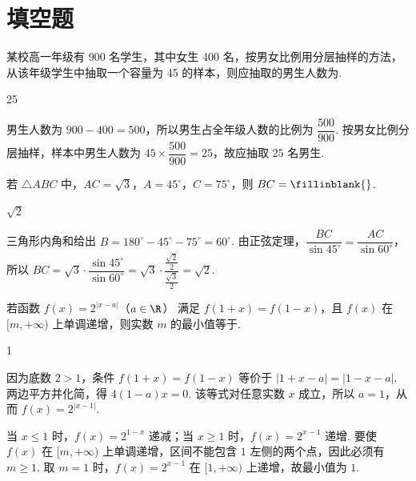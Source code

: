\section{填空题}

\begin{problem}
某校高一年级有 900 名学生，其中女生 400 名，按男女比例用分层抽样的方法，从该年级学生中抽取一个容量为 45 的样本，则应抽取的男生人数为\fillinblank{}.
\end{problem}

\begin{answer}
25
\end{answer}

\begin{solution}
男生人数为 \(900-400=500\)，所以男生占全年级人数的比例为 \(\dfrac{500}{900}\). 按男女比例分层抽样，样本中男生人数为 \(45\times\dfrac{500}{900}=25\)，故应抽取 \(25\) 名男生.
\end{solution}

\begin{problem}
若 \(\triangle ABC\) 中，\(AC = \sqrt{3}\)，\(A = 45^{\circ}\)，\(C = 75^{\circ}\)，则 \(BC =\fillinblank{}\).
\end{problem}

\begin{answer}
\(\sqrt{2}\)
\end{answer}

\begin{solution}
三角形内角和给出 \(B=180^{\circ}-45^{\circ}-75^{\circ}=60^{\circ}\). 由正弦定理，\(\dfrac{BC}{\sin45^{\circ}}=\dfrac{AC}{\sin60^{\circ}}\)，所以
\(BC=\sqrt3\cdot\dfrac{\sin45^{\circ}}{\sin60^{\circ}}=\sqrt3\cdot\dfrac{\frac{\sqrt2}{2}}{\frac{\sqrt3}{2}}=\sqrt2\).
\end{solution}

\begin{problem}
若函数 \(f(x) = 2^{|x-a|}\)（\(a \in \R\)） 满足 \( f(1 + x) = f(1 - x) \)，且 \( f(x) \) 在 \([m, +\infty)\) 上单调递增，则实数 \( m \) 的最小值等于\fillinblank{}.
\end{problem}

\begin{answer}
1
\end{answer}

\begin{solution}
因为底数 \(2>1\)，条件 \(f(1+x)=f(1-x)\) 等价于 \(|1+x-a|=|1-x-a|\). 两边平方并化简，得 \(4(1-a)x=0\). 该等式对任意实数 \(x\) 成立，所以 \(a=1\)，从而 \(f(x)=2^{|x-1|}\).

当 \(x\leqslant1\) 时，\(f(x)=2^{1-x}\) 递减；当 \(x\geqslant1\) 时，\(f(x)=2^{x-1}\) 递增. 要使 \(f(x)\) 在 \([m,+\infty)\) 上单调递增，区间不能包含 \(1\) 左侧的两个点，因此必须有 \(m\geqslant1\). 取 \(m=1\) 时，\(f(x)=2^{x-1}\) 在 \([1,+\infty)\) 上递增，故最小值为 \(1\).
\end{solution}

